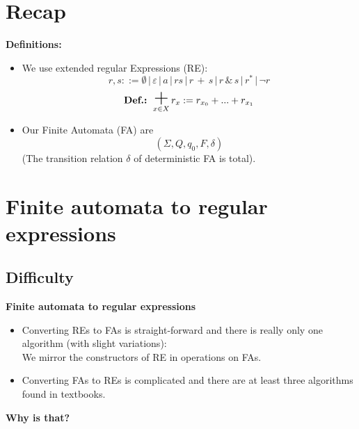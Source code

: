 \documentclass{beamer}
\DeclareMathOperator*{\bigplus}{\mbox{\huge +}}
\begin{document}
\section*{Recap}
\begin{frame}
    \textbf{Definitions:} \\

    \begin{itemize}
        \item 
            We use extended regular Expressions (RE):
            \[    
                r, s ::= \emptyset \, | \, \varepsilon \, | \,  a \, | \, rs \, | \,  r \,  + \, s \, | \, r \, \& \, s \, |\, r^* \, | \, \neg r
            \]
            \[
                \mbox{\textbf{Def.:} }  \bigplus_{x \in X} r_x := r_{x_0} + ... + r_{x_1}
            \]

        \item 
            Our Finite Automata (FA) are
            \[
                (\Sigma, Q, q_0, F, \delta)
            \]
            (The transition relation $\delta$ of deterministic FA is total).
    \end{itemize}
\end{frame}

\section*{Finite automata to regular expressions}
\subsection*{Difficulty}
\begin{frame}

    \large{\textbf{Finite automata to regular expressions}}

    \begin{itemize}
        \item
            Converting REs to FAs is straight-forward and there is really only one algorithm (with slight variations): \\
            We mirror the constructors of RE in operations on FAs.

            \pause

        \item
            Converting FAs to REs is complicated and there are at least three algorithms found in textbooks.
    \end{itemize}

    \pause

    \textbf{Why is that?}

\end{frame}
\end{document}
